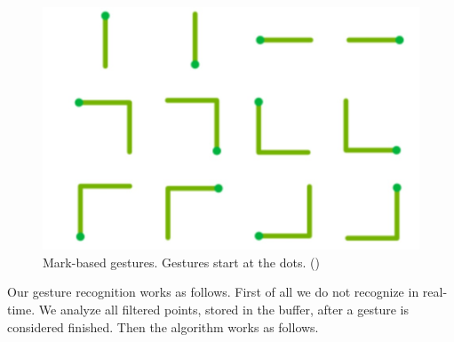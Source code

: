 \begin{figure}
 \includegraphics[scale=0.25]{images/markBasedGestures.jpg}
 \caption{Mark-based gestures. Gestures start at the dots. (\cite{Bragdon})}
 \label{fig:markBasedGestures}
 \end{figure}Our gesture recognition works as follows. First of all we do not recognize in real-time. We analyze all filtered points, stored in the buffer, after a gesture is considered finished.  Then the algorithm works as follows.
